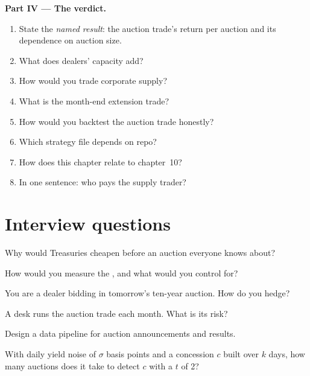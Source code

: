 \begin{problem}
\medskip\noindent\textbf{Part IV --- The verdict.}
\begin{enumerate}[resume]
\item State the \emph{named result}: the auction trade's return per auction and its dependence on auction size.
\item What does dealers' capacity add?
\item How would you trade corporate supply?
\item What is the month-end extension trade?
\item How would you backtest the auction trade honestly?
\item Which strategy file depends on repo?
\item How does this chapter relate to chapter~10?
\item In one sentence: who pays the supply trader?
\end{enumerate}
\end{problem}

\section{Interview questions}

\begin{interviewq}\label{iq:s2:supply-trades:1}
Why would Treasuries cheapen before an auction everyone knows about?
\end{interviewq}

\begin{interviewq}\label{iq:s2:supply-trades:2}
How would you measure the , and what would you control for?
\end{interviewq}

\begin{interviewq}\label{iq:s2:supply-trades:3}
You are a dealer bidding in tomorrow's ten-year auction. How do you hedge?
\end{interviewq}

\begin{interviewq}\label{iq:s2:supply-trades:4}
A desk runs the auction trade each month. What is its risk?
\end{interviewq}

\begin{interviewq}\label{iq:s2:supply-trades:5}
Design a data pipeline for auction announcements and results.
\end{interviewq}

\begin{interviewq}\label{iq:s2:supply-trades:6}
With daily yield noise of $\sigma$ basis points and a concession $c$ built over $k$ days, how many auctions does it take to detect $c$ with a $t$ of 2?
\end{interviewq}
